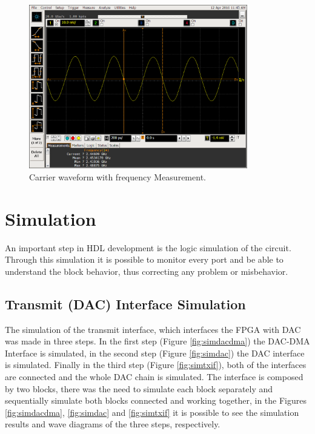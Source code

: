 \begin{figure}[htbp]
    \centering
    \includegraphics[width=0.85\textwidth,
    trim={{.17\textwidth} 0 {.02\textwidth} {.24\textwidth}},
    clip]{./figures/oscill_freq}
    \caption{ Carrier waveform with frequency Measurement.
    \label{fig:oscillfreq}}
\end{figure}


\vspace{50pt}

\section{Simulation}

An important step in HDL development is the logic simulation of the circuit.
Through this simulation it is possible to monitor every port and be able to
understand the block behavior, thus correcting any problem or misbehavior.

\subsection{Transmit (DAC) Interface Simulation}

The simulation of the transmit interface, which interfaces the FPGA with DAC was
made in three steps. In the first step (Figure \ref{fig:simdacdma}) the DAC-DMA
Interface is simulated, in the second step (Figure \ref{fig:simdac}) the DAC
interface is simulated. Finally in the third step (Figure \ref{fig:simtxif}),
both of the interfaces are connected and the whole DAC chain is simulated. The
interface is composed by two blocks, there was the need to simulate each block
separately and sequentially simulate both blocks connected and working together,
in the Figures \ref{fig:simdacdma}, \ref{fig:simdac} and \ref{fig:simtxif} it is
possible to see the simulation results and wave diagrams of the three steps,
respectively.


